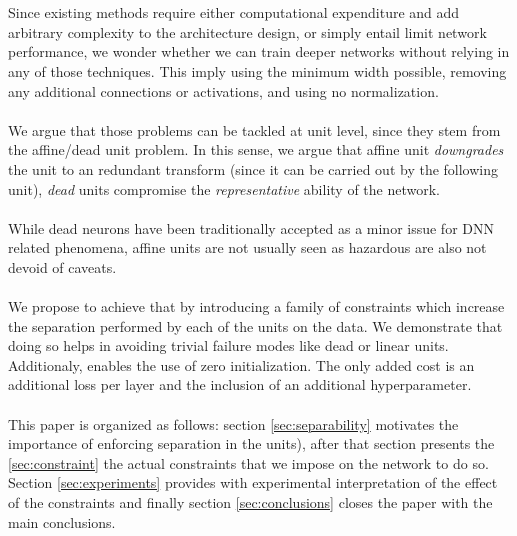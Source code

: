 \\\\
Since existing methods require either computational expenditure and add arbitrary complexity to the architecture design, or simply entail limit network performance, we wonder whether we can train deeper networks without relying in any of those techniques. This imply using the minimum width possible, removing any additional connections or activations, and using no normalization. 
\\\\
We argue that those problems can be tackled at unit level, since they stem from the affine/dead unit problem. In this sense, we argue that 
affine unit \emph{downgrades} the unit to an redundant transform (since it can be carried out by the following unit), \emph{dead} units compromise the \emph{representative} ability of the network.
\\\\
While dead neurons have been traditionally accepted as a minor issue for DNN related phenomena, affine units are not usually seen as hazardous are also not devoid of caveats.
\\\\
We propose to achieve that by introducing a family of constraints which increase the separation performed by each of the units on the data. We demonstrate that doing so helps in avoiding trivial failure modes like dead or linear units. Additionaly, enables the use of zero initialization. The only added cost is an additional loss per layer and the inclusion of an additional hyperparameter. 
\\\\
This paper is organized as follows: section \ref{sec:separability} motivates the importance of enforcing separation in the units), after that section presents the \ref{sec:constraint} the actual constraints that we impose on the network to do so. Section \ref{sec:experiments} provides with experimental interpretation of the effect of the constraints and finally section \ref{sec:conclusions} closes the paper with the main conclusions.

